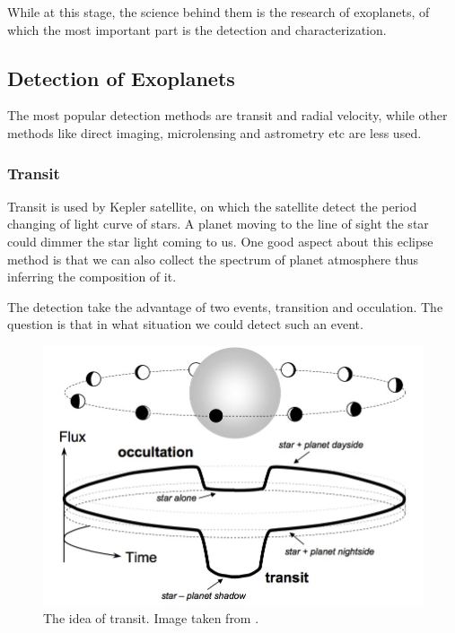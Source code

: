 \documentclass[12pt]{article}
\begin{document}
While at this stage, the science behind them is the research of exoplanets, of which the most important part is the detection and characterization.



\subsection*{Detection of Exoplanets}

The most popular detection methods are transit and radial velocity, while other methods like direct imaging, microlensing and astrometry etc are less used.

\subsubsection*{Transit}

Transit is used by Kepler satellite, on which the satellite detect the period changing of light curve of stars. A planet moving to the line of sight the star could dimmer the star light coming to us. One good aspect about this eclipse method is that we can also collect the spectrum of planet atmosphere thus inferring the composition of it.

The detection take the advantage of two events, transition and occulation. The question is that in what situation we could detect such an event.


\begin{figure}
\centering
\includegraphics[width=\textwidth]{./assets/transit}
\caption{The idea of transit. Image taken from \cite{2010arXiv1001.2010W}.}
\label{fig:transit}
\end{figure}
\end{document}
